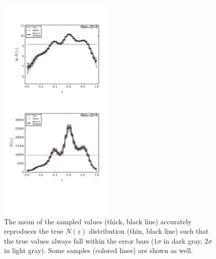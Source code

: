 \documentclass[preprint]{aastex}
\begin{document}
\begin{figure}
\includegraphics[width=0.5\textwidth]{figs/vars/samps.pdf}
\caption{The mean of the sampled values (thick, black line) accurately 
reproduces the true $N(z)$ distribution (thin, black line) such that the true 
values always fall within the error bars ($1\sigma$ in dark gray, $2\sigma$ in 
light gray).  Some samples (colored lines) are shown as well.}
\label{fig:noisy-samp}
\end{figure}
\end{document}
